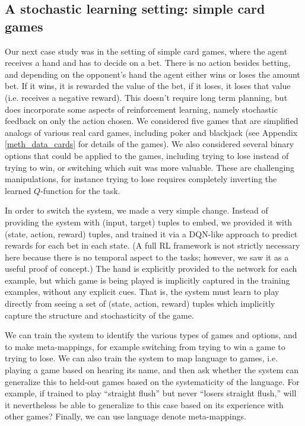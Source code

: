 \documentclass{article}
\begin{document}
\subsection{A stochastic learning setting: simple card games}
Our next case study was in the setting of simple card games, where the agent receives a hand and has to decide on a bet. There is no action besides betting, and depending on the opponent's hand the agent either wins or loses the amount bet. If it wins, it is rewarded the value of the bet, if it loses, it loses that value (i.e. receives a negative reward). This doesn't require long term planning, but does incorporate some aspects of reinforcement learning, namely stochastic feedback on only the action chosen. We considered five games that are simplified analogs of various real card games, including poker and blackjack (see Appendix \ref{meth_data_cards} for details of the games). We also considered several binary options that could be applied to the games, including trying to lose instead of trying to win, or switching which suit was more valuable. These are challenging manipulations, for instance trying to lose requires completely inverting the learned $Q$-function for the task. \par
In order to switch the system, we made a very simple change. Instead of providing the system with (input, target) tuples to embed, we provided it with (state, action, reward) tuples, and trained it via a DQN-like approach \citep{Mnih2015} to predict rewards for each bet in each state. (A full RL framework is not strictly necessary here because there is no temporal aspect to the tasks; however, we saw it as a useful proof of concept.) The hand is explicitly provided to the network for each example, but which game is being played is implicitly captured in the training examples, without any explicit cues. That is, the system must learn to play directly from seeing a set of (state, action, reward) tuples which implicitly capture the structure and stochasticity of the game. \par   
We can train the system to identify the various types of games and options, and to make meta-mappings, for example switching from trying to win a game to trying to lose. We can also train the system to map language to games, i.e. playing a game based on hearing its name, and then ask whether the system can generalize this to held-out games based on the systematicity of the language. For example, if trained to play ``straight flush'' but never ``losers straight flush,'' will it nevertheless be able to generalize to this case based on its experience with other games? Finally, we can use language denote meta-mappings. \par
\end{document}
